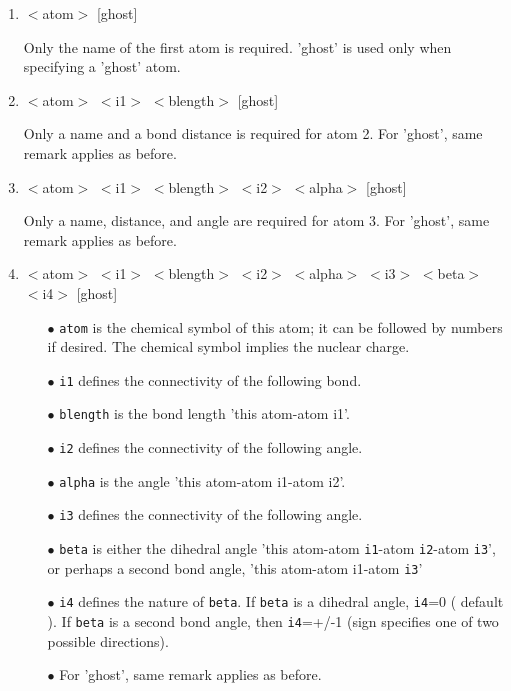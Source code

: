 \begin{enumerate}

   \item $<$atom$>$ [ghost]

    Only  the  name  of the first atom is required. 'ghost' is used
    only when specifying a 'ghost' atom.

   \item $<$atom$>$ $<$i1$>$ $<$blength$>$ [ghost]

    Only a name and a bond distance is required for atom 2.    For
    'ghost', same remark applies as before.

   \item $<$atom$>$ $<$i1$>$ $<$blength$>$ $<$i2$>$ $<$alpha$>$ [ghost]

    Only  a  name, distance, and angle are required for atom 3.  For
    'ghost', same remark applies as before.

   \item $<$atom$>$ $<$i1$>$ $<$blength$>$ $<$i2$>$ $<$alpha$>$ $<$i3$>$ $<$beta$>$ $<$i4$>$ [ghost] %
        
    \begin{itemize}
    \item [$\bullet$]  {\tt atom} is the chemical symbol of this
        atom;  it  can  be followed  
        by numbers if desired. The chemical symbol implies the nuclear
        charge.  
    \item [$\bullet$]  {\tt i1} defines the connectivity of the following bond.  
    \item [$\bullet$]  {\tt blength} is the bond length 'this atom-atom i1'.  
    \item [$\bullet$]  {\tt i2} defines the connectivity of the following angle.  
    \item [$\bullet$]  {\tt alpha} is the angle 'this atom-atom i1-atom i2'.  
    \item [$\bullet$]  {\tt i3} defines the connectivity of the following angle.  
    \item [$\bullet$]  {\tt beta}  is  either  the dihedral angle
'this atom-atom {\tt i1}-atom {\tt i2}-atom 
        {\tt i3}', or perhaps a second bond angle, 'this atom-atom i1-atom {\tt i3}' 
    \item [$\bullet$]  {\tt i4} defines the nature of {\tt beta}.  If
{\tt beta} is a dihedral
        angle,  {\tt i4}=0  ( default ).  If {\tt beta} is a second bond angle,
        then {\tt i4}=+/-1 
        (sign specifies one of two possible directions).  
    \item [$\bullet$]  For 'ghost', same remark applies as before.
    \end{itemize}


\end{enumerate}

